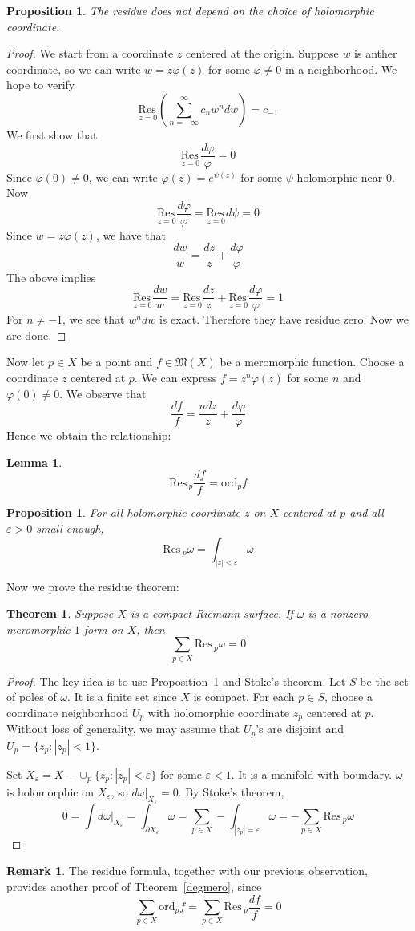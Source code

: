 \documentclass[12pt]{article}
\theoremstyle{plain}
\newtheorem{theorem}[equation]{Theorem}
\newtheorem{lemma}[equation]{Lemma}
\newtheorem{proposition}[equation]{Proposition}
\theoremstyle{definition}
\newtheorem{remark}[equation]{Remark}
\newcommand{\fM}{\mathfrak{M}}
\newcommand{\Res}{\mathrm{Res}\,}
\newcommand{\<}{\langle}
\renewcommand{\>}{\rangle}
\newcommand{\w}{\omega}
\newcommand{\ord}{\mathrm{ord}}
\newcommand{\p}{\partial}
\newcommand{\sm}{\varepsilon}
\newcommand{\Resz}{\underset{z = 0}{\Res}}
\begin{document}
\begin{proposition}
The residue does not depend on the choice of holomorphic coordinate. 
\end{proposition}
\begin{proof}
We start from a coordinate $z$ centered at the origin. Suppose $w$ is anther coordinate, so we can write $w = z \varphi(z)$ for some $\varphi \neq 0$ in a neighborhood. We hope to verify 
$$ \underset{z = 0}{\Res} (\sum_{n = - \infty}^\infty c_n w^n dw) = c_{-1} $$
We first show that 
$$ \Resz \frac{d \varphi}{\varphi} = 0 $$
Since $\varphi(0) \neq 0$, we can write $\varphi(z) = e^{\psi(z)}$ for some $\psi$ holomorphic near $0$. Now 
$$  \Resz \frac{d \varphi}{\varphi} = \Resz d \psi = 0 $$
Since $w = z \varphi(z)$, we have that 
$$ \frac{dw}{w} = \frac{dz}{z} + \frac{d\varphi}{\varphi} $$
The above implies 
$$
\Resz \frac{dw}{w} = \Resz \frac{dz}{z} + \Resz \frac{d\varphi}{\varphi} = 1 
$$
For $n \neq -1$, we see that $w^n dw$ is exact. Therefore they have residue zero. Now we are done.
\end{proof}

Now let $p \in X$ be a point and $f \in \fM(X)$ be a meromorphic function. Choose a coordinate $z$ centered at $p$. We can express $f = z^n \varphi(z)$ for some $n$ and $\varphi(0) \neq 0$. We observe that 
$$ \frac{df}{f} = \frac{n dz}{z} + \frac{d \varphi}{\varphi}$$
Hence we obtain the relationship:
\begin{lemma}
\label{resord}
$$ \Res_p \frac{df}{f} = \ord_p f $$
\end{lemma}

\begin{proposition}
\label{resandint}
For all holomorphic coordinate $z$ on $X$ centered at $p$ and all $\sm > 0$ small enough, 
$$\Res_p \w = \int_{|z| < \sm} \w $$
\end{proposition}

Now we prove the residue theorem: 
\begin{theorem}
Suppose $X$ is a compact Riemann surface. If $\w$ is a nonzero meromorphic $1$-form on $X$, then 
$$ \sum_{p \in X} \Res_p \w = 0 $$
\end{theorem}
\begin{proof}
The key idea is to use Proposition~\ref{resandint} and Stoke's theorem. 
Let $S$ be the set of poles of $\w$. It is a finite set since $X$ is compact. For each $p \in S$, choose a coordinate neighborhood $U_p$ with holomorphic coordinate $z_p$ centered at $p$. Without loss of generality, we may assume that $U_p$'s are disjoint and $U_p = \{z_p : |z_p| < 1 \}$. 

Set $X_\sm = X - \cup_p \{ z_p : |z_p| < \sm \} $ for some $\sm < 1$. It is a manifold with boundary. $\w$ is holomorphic on $X_\sm$, so $d \w|_{X_\sm} = 0$. By Stoke's theorem,
$$ 0 = \int d\w|_{X_\sm} = \int_{\p X_\sm} \w = \sum_{p \in X} - \int_{|z_p| = \sm} \w = - \sum_{p \in X} \Res_p \w $$ 
\end{proof}
\begin{remark}
The residue formula, together with our previous observation, provides another proof of Theorem~\ref{degmero}, since
$$ \sum_{p \in X} \ord_p f = \sum_{p \in X} \Res_p \frac{df}{f} = 0 $$
\end{remark}
\end{document}
